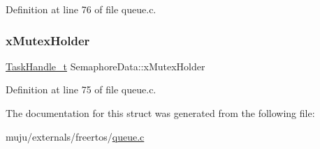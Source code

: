 Definition at line 76 of file queue.\+c.

\mbox{\label{struct_semaphore_data_ab1ed54c7b39dc45b3c310fae7ad08693}} 
\subsubsection{\texorpdfstring{x\+Mutex\+Holder}{xMutexHolder}}
{\footnotesize\ttfamily \hyperlink{externals_2freertos_2include_2task_8h_a25b35e6e19ecf894173e7ff95edb96ef}{Task\+Handle\+\_\+t} Semaphore\+Data\+::x\+Mutex\+Holder}



Definition at line 75 of file queue.\+c.



The documentation for this struct was generated from the following file\+:\begin{DoxyCompactItemize}
\item 
muju/externals/freertos/\hyperlink{externals_2freertos_2queue_8c}{queue.\+c}\end{DoxyCompactItemize}
